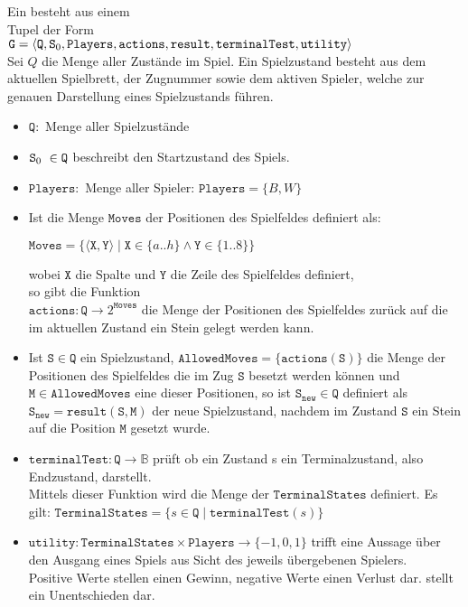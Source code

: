 \begin{Definition}
Ein  besteht aus einem \\Tupel der Form \\[0.2cm]
  \hspace*{1.3cm}
  $\mathtt{G} = \langle \mathtt{Q}, \mathtt{S}\textsubscript{0},\mathtt{Players}, \mathtt{actions}, \mathtt{result}, \mathtt{terminalTest}, \mathtt{utility} \rangle$
\\Sei $Q$ die Menge aller Zustände im Spiel. Ein Spielzustand besteht aus dem aktuellen Spielbrett, der Zugnummer sowie dem aktiven Spieler, welche zur genauen Darstellung eines Spielzustands führen.
\begin{itemize}
\item $\mathtt{Q}:$ Menge aller Spielzustände
\item $\mathtt{S\textsubscript{0}}\ \in \mathtt{Q}$ beschreibt den Startzustand des Spiels.
\item $\mathtt{Players}:$ Menge aller Spieler: $\mathtt{Players} = \{B,W\}$
\newpage
\item Ist die Menge $\mathtt{Moves}$ der Positionen des Spielfeldes definiert als:
\begin{center}$\mathtt{Moves} = \{ \langle \mathtt{X}, \mathtt{Y} \rangle \mid \mathtt{X} \in \{a .. h\} \wedge \mathtt{Y} \in \{ 1 .. 8 \} \} $
\end{center}
wobei $\mathtt{X}$ die Spalte und $\mathtt{Y}$ die Zeile des Spielfeldes definiert,
\\so gibt die Funktion
\\$\mathtt{actions}: \mathtt{Q} \rightarrow 2^\mathtt{Moves}$ die Menge der Positionen des Spielfeldes zurück auf die im aktuellen Zustand ein Stein gelegt werden kann. 
\item Ist $\mathtt{S} \in \mathtt{Q}$ 
ein Spielzustand, $\mathtt{AllowedMoves} = \{ \mathtt{actions}(\mathtt{S})\}$ 
die Menge der Positionen des Spielfeldes die im Zug $\mathtt{S}$ 
besetzt werden können und $\mathtt{M} \in \mathtt{AllowedMoves}$ 
eine dieser Positionen, so ist $\mathtt{S}_{\mathtt{new}} \in \mathtt{Q} $ 
definiert als $\mathtt{S}_{\mathtt{new}} = \mathtt{result}(\mathtt{S}, \mathtt{M})$ 
der neue Spielzustand, nachdem im Zustand $\mathtt{S}$ 
ein Stein auf die Position $\mathtt{M}$ gesetzt wurde.
\item $\mathtt{terminalTest}: \mathtt{Q} \rightarrow \mathbb{B}$ prüft ob ein Zustand s ein Terminalzustand, also Endzustand, darstellt.
\\Mittels dieser Funktion wird die Menge der $\mathtt{TerminalStates}$ definiert. Es gilt:
$ \mathtt{TerminalStates} = \{ s \in \mathtt{Q} \mid \mathtt{terminalTest}(s)\}$
\item $\mathtt{utility}: \mathtt{TerminalStates} \times \mathtt{Players} \rightarrow \{-1, 0, 1 \}$ trifft eine Aussage über den Ausgang eines Spiels aus Sicht des jeweils übergebenen Spielers. \\Positive Werte stellen einen Gewinn, negative Werte einen Verlust dar.  stellt ein Unentschieden dar.
\end{itemize}
\end{Definition}
